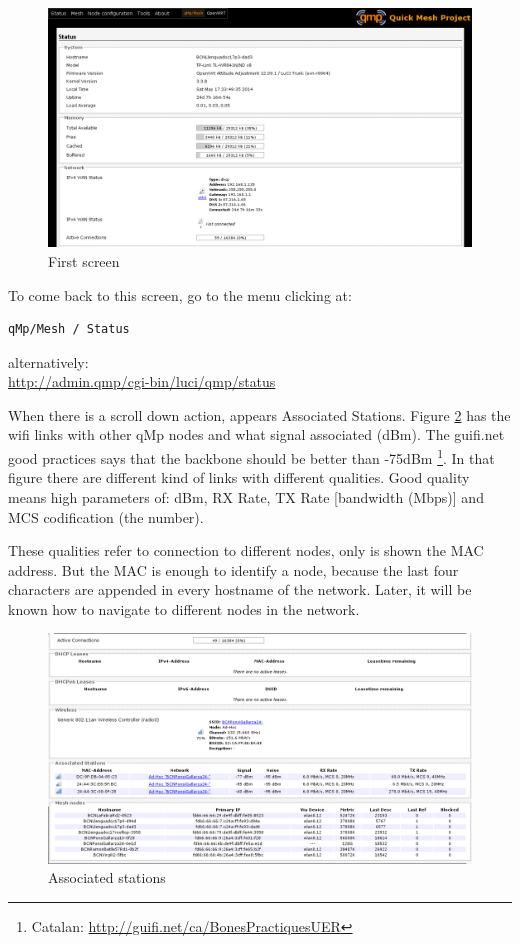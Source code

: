 \documentclass[11pt]{article}
\begin{document}
\begin{figure}[htb]
\centering
\includegraphics[width=.9\linewidth]{./img/qMp-basics-scrot/status-wan_status.png}
\caption{\label{fig:wan-status-on}First screen}
\end{figure}

\noindent
To come back to this screen, go to the menu clicking at:
\begin{verbatim}
qMp/Mesh / Status
\end{verbatim}
alternatively:\\
\url{http://admin.qmp/cgi-bin/luci/qmp/status}

When there is a scroll down action, appears Associated
Stations. Figure \ref{fig:associated-stations} has the wifi links with other
qMp nodes and what signal associated (dBm). The guifi.net good
practices says that the backbone should be better than
-75dBm \footnote{Catalan: \url{http://guifi.net/ca/BonesPractiquesUER}}. In that figure there are different kind of links with
different qualities. Good quality means high parameters of: dBm, RX
Rate, TX Rate [bandwidth (Mbps)] and MCS codification (the number).

These qualities refer to connection to different nodes, only is
shown the MAC address. But the MAC is enough to identify a node,
because the last four characters are appended in every hostname of the
network. Later, it will be known how to navigate to different nodes in the
network.

\begin{figure}[htb]
\centering
\includegraphics[width=.9\linewidth]{./img/qMp-basics-scrot/status-associated-nodes.png}
\caption{\label{fig:associated-stations}Associated stations}
\end{figure}
\end{document}
